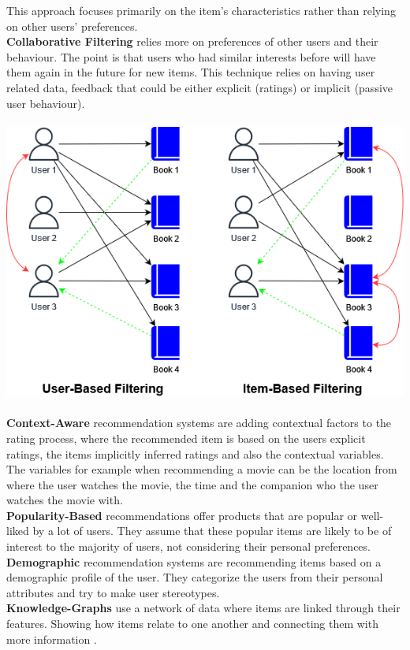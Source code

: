 \documentclass[10pt, oneside,english,hidelinks,a4paper]{article}
\begin{document}
\begin{multicols}{2}
This approach focuses primarily on the item's characteristics rather than relying on other users' preferences.\\
\textbf{Collaborative Filtering} relies more on preferences of other users and their behaviour. The point is that users who had similar interests before will have them again in the future for new items. This technique relies on having user related data, feedback that could be either explicit (ratings) or implicit (passive user behaviour).\\\\
\noindent
\includegraphics[width=\columnwidth]{img/collaborative_example.png}\\\\
\textbf{Context-Aware} recommendation systems are adding contextual factors to the rating process, where the recommended item is based on the users explicit ratings, the items implicitly inferred ratings and also the contextual variables. The variables for example when recommending a movie can be the location from where the user watches the movie, the time and the companion who the user watches the movie with.\\
\textbf{Popularity-Based} recommendations offer products that are popular or well-liked by a lot of users. They assume that these popular items are likely to be of interest to the majority of users, not considering their personal preferences.\\
\textbf{Demographic} recommendation systems are recommending items based on a demographic profile of the user. They categorize the users from their personal attributes and try to make user stereotypes.\\
\textbf{Knowledge-Graphs} use a network of data where items are linked through their features. Showing how items relate to one another and connecting them with more information \cite{Imene2022488}.\\

\end{multicols}
\end{document}
